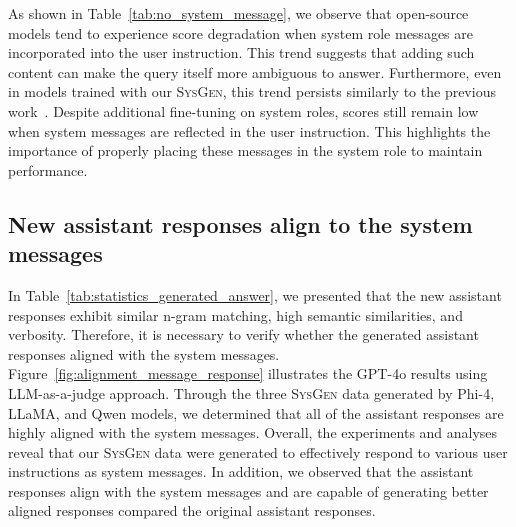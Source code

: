 As shown in Table~\ref{tab:no_system_message}, we observe that open-source models tend to experience score degradation when system role messages are incorporated into the user instruction.
This trend suggests that adding such content can make the query itself more ambiguous to answer.
Furthermore, even in models trained with our \textsc{SysGen}, this trend persists similarly to the previous work~\citep{lee2024aligning}.
Despite additional fine-tuning on system roles, scores still remain low when system messages are reflected in the user instruction.
This highlights the importance of properly placing these messages in the system role to maintain performance.

\subsection{New assistant responses align to the system messages}

In Table~\ref{tab:statistics_generated_answer}, we presented that the new assistant responses exhibit similar n-gram matching, high semantic similarities, and verbosity.
Therefore, it is necessary to verify whether the generated assistant responses aligned with the system messages.
Figure~\ref{fig:alignment_message_response} illustrates the GPT-4o results using LLM-as-a-judge approach.
Through the three \textsc{SysGen} data generated by Phi-4, LLaMA, and Qwen models, we determined that all of the assistant responses are highly aligned with the system messages.
Overall, the experiments and analyses reveal that our \textsc{SysGen} data were generated to effectively respond to various user instructions as system messages.
In addition, we observed that the assistant responses align with the system messages and are capable of generating better aligned responses compared the original assistant responses.
